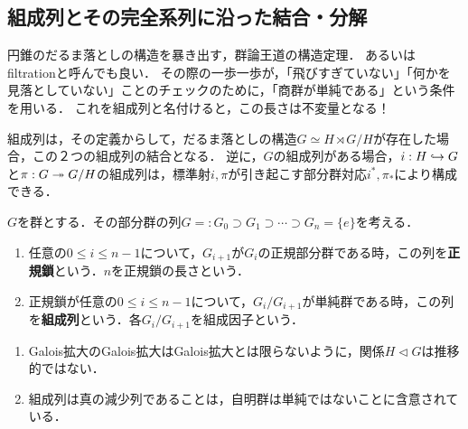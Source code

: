 \documentclass[uplatex,dvipdfmx]{jsreport}
\begin{document}
\subsection{組成列とその完全系列に沿った結合・分解}

\begin{tcolorbox}[colframe=ForestGreen, colback=ForestGreen!10!white,breakable,colbacktitle=ForestGreen!40!white,coltitle=black,fonttitle=\bfseries\sffamily,
title=]
    円錐のだるま落としの構造を暴き出す，群論王道の構造定理．
    あるいはfiltrationと呼んでも良い．
    その際の一歩一歩が，「飛びすぎていない」「何かを見落としていない」ことのチェックのために，「商群が単純である」という条件を用いる．
    これを組成列と名付けると，この長さは不変量となる！

    組成列は，その定義からして，だるま落としの構造$G\simeq H\rtimes G/H$が存在した場合，この２つの組成列の結合となる．
    逆に，$G$の組成列がある場合，$i:H\hookrightarrow G$と$\pi:G\twoheadrightarrow G/H$の組成列は，標準射$i,\pi$が引き起こす部分群対応$i^*,\pi_*$により構成できる．
\end{tcolorbox}

\begin{definition}
    $G$を群とする．その部分群の列$G=:G_0\supset G_1\supset\cdots\supset G_n=\{e\}$を考える．
    \begin{enumerate}
        \item 任意の$0\le i\le n-1$について，$G_{i+1}$が$G_{i}$の正規部分群である時，この列を\textbf{正規鎖}という．$n$を正規鎖の長さという．
        \item 正規鎖が任意の$0\le i\le n-1$について，$G_i/G_{i+1}$が単純群である時，この列を\textbf{組成列}という．各$G_{i}/G_{i+1}$を組成因子という．
    \end{enumerate}
\end{definition}
\begin{remark}\mbox{}
    \begin{enumerate}
        \item Galois拡大のGalois拡大はGalois拡大とは限らないように，関係$H\triangleleft G$は推移的ではない．
        \item 組成列は真の減少列であることは，自明群は単純ではないことに含意されている．
    \end{enumerate}
\end{remark}
\end{document}
